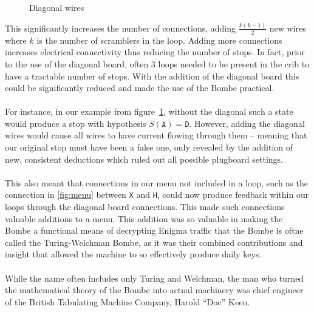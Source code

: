 \begin{figure}[H]
\begin{center}
	\end{center}
	\caption{Diagonal wires}
	\label{fig:diagonal}
\end{figure}
\noindent This significantly increases the number of connections,
adding $\frac{k(k-1)}{2}$ new wires where $k$ is the number of
scramblers in the loop. Adding more connections increases electrical
connectivity thus reducing the number of stops. In fact, prior to the
use of the diagonal board, often $3$ loops needed to be present in
the crib to have a tractable number of stops. With the addition of
the diagonal board this could be significantly reduced and made the
use of the Bombe practical.
\\\\For instance, in our example from figure~\ref{fig:diagonal},
without the diagonal such a state would produce a stop with
hypothesis $S(\texttt{A}) = \texttt{D}$. However, adding the diagonal
wires would cause all wires to have current flowing through them --
meaning that our original stop must have been a false one, only
revealed by the addition of new, consistent deductions which ruled
out all possible plugboard settings.
\\\\This also meant that connections in our menu not included in a
loop, such as the connection in \ref{fig:menu} between \texttt{X} and
\texttt{H}, could now produce feedback within our loops through the
diagonal board connections. This made such connections valuable
additions to a menu. This addition was so valuable in making the Bombe a functional means of decrypting Enigma traffic that the Bombe is oftne called the Turing-Welchman Bombe, as it was their combined contributions and insight that allowed the machine to so effectively produce daily keys.
\\\\While the name often includes only Turing and Welchman, the man who turned the mathematical theory of the Bombe into actual machinery was chief engineer of the British Tabulating Machine Company, Harold ``Doc'' Keen.

